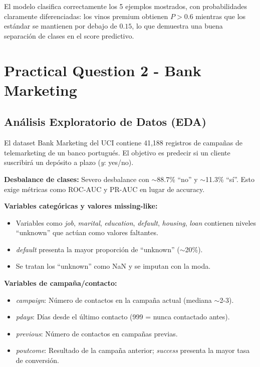\documentclass[11pt,spanish]{article}
\begin{document}
El modelo clasifica correctamente los 5 ejemplos mostrados, con probabilidades claramente diferenciadas: los vinos premium obtienen $P > 0.6$ mientras que los estándar se mantienen por debajo de $0.15$, lo que demuestra una buena separación de clases en el score predictivo.

\section{Practical Question 2 - Bank Marketing}

\subsection{Análisis Exploratorio de Datos (EDA)}

El dataset Bank Marketing del UCI contiene 41,188 registros de campañas de telemarketing de un banco portugués. El objetivo es predecir si un cliente suscribirá un depósito a plazo (\textit{y}: yes/no).

\textbf{Desbalance de clases:} Severo desbalance con $\sim$88.7\% ``no'' y $\sim$11.3\% ``sí''. Esto exige métricas como ROC-AUC y PR-AUC en lugar de accuracy.

\textbf{Variables categóricas y valores missing-like:}
\begin{itemize}
    \item Variables como \textit{job}, \textit{marital}, \textit{education}, \textit{default}, \textit{housing}, \textit{loan} contienen niveles ``unknown'' que actúan como valores faltantes.
    \item \textit{default} presenta la mayor proporción de ``unknown'' ($\sim$20\%).
    \item Se tratan los ``unknown'' como NaN y se imputan con la moda.
\end{itemize}

\textbf{Variables de campaña/contacto:}
\begin{itemize}
    \item \textit{campaign}: Número de contactos en la campaña actual (mediana $\sim$2-3).
    \item \textit{pdays}: Días desde el último contacto (999 = nunca contactado antes).
    \item \textit{previous}: Número de contactos en campañas previas.
    \item \textit{poutcome}: Resultado de la campaña anterior; \textit{success} presenta la mayor tasa de conversión.
\end{itemize}
\end{document}
